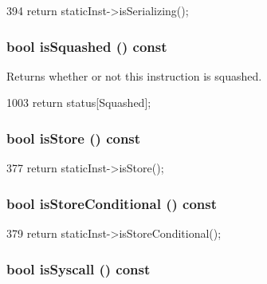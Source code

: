 \begin{DoxyCode}
394 { return staticInst->isSerializing(); }
\end{DoxyCode}
\hypertarget{classInOrderDynInst_add8df091bd836cf92c6987990d130b83}{
\subsubsection[{isSquashed}]{\setlength{\rightskip}{0pt plus 5cm}bool isSquashed () const}}
\label{classInOrderDynInst_add8df091bd836cf92c6987990d130b83}
Returns whether or not this instruction is squashed. 


\begin{DoxyCode}
1003 { return status[Squashed]; }
\end{DoxyCode}
\hypertarget{classInOrderDynInst_a75d02c30242181ed8a68f61087c2242d}{
\subsubsection[{isStore}]{\setlength{\rightskip}{0pt plus 5cm}bool isStore () const}}
\label{classInOrderDynInst_a75d02c30242181ed8a68f61087c2242d}



\begin{DoxyCode}
377 { return staticInst->isStore(); }
\end{DoxyCode}
\hypertarget{classInOrderDynInst_a7023ade89206ed967e6af7397cb744f8}{
\subsubsection[{isStoreConditional}]{\setlength{\rightskip}{0pt plus 5cm}bool isStoreConditional () const}}
\label{classInOrderDynInst_a7023ade89206ed967e6af7397cb744f8}



\begin{DoxyCode}
379     { return staticInst->isStoreConditional(); }
\end{DoxyCode}
\hypertarget{classInOrderDynInst_afa3ec9c6fc7c50b26c6811c3bf1bb5f0}{
\subsubsection[{isSyscall}]{\setlength{\rightskip}{0pt plus 5cm}bool isSyscall () const}}
\label{classInOrderDynInst_afa3ec9c6fc7c50b26c6811c3bf1bb5f0}



